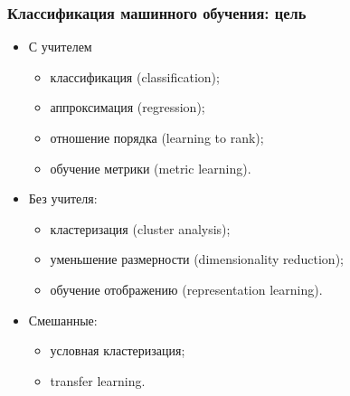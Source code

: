 \documentclass[14pt, fleqn, xcolor={dvipsnames, table}]{beamer}
\begin{document}
\begin{frame}
\frametitle{Классификация машинного обучения: цель}
\begin{itemize}
	\item С учителем
	\begin{itemize}
		\item классификация (classification);
		\item аппроксимация (regression);
		\item отношение порядка (learning to rank);
		\item обучение метрики (metric learning).
	\end{itemize}
	\item Без учителя:
	\begin{itemize}
		\item кластеризация (cluster analysis);
		\item уменьшение размерности (dimensionality reduction);
		\item обучение отображению (representation learning).
	\end{itemize}
	\item Смешанные:
	\begin{itemize}
		\item условная кластеризация;
		\item transfer learning.
	\end{itemize}
\end{itemize}
\end{frame}
\end{document}
